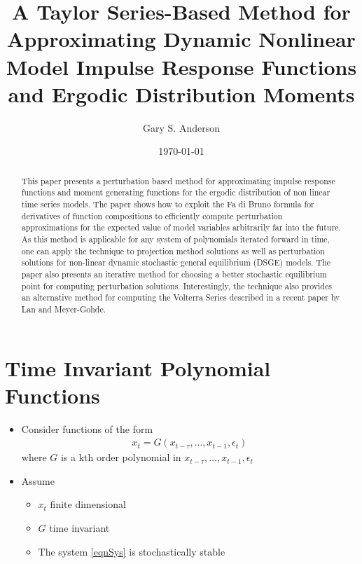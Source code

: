 \documentclass[12pt]{article}
\title{A Taylor Series-{Based} Method for Approximating Dynamic Nonlinear Model Impulse Response Functions and Ergodic Distribution Moments }
\author{Gary S. Anderson}
\date{\today}
\begin{document}
\maketitle
\begin{abstract}
  This paper presents a perturbation based method for approximating
impulse response functions and moment generating functions for the ergodic distribution of non linear time series models. The paper shows how to exploit the Fa di Bruno formula for derivatives of function compositions to efficiently compute perturbation approximations for the expected value of model variables arbitrarily far into the future. As this method is applicable for any system of polynomials iterated forward in time, one can apply the technique to projection method solutions as well as perturbation solutions for non-linear dynamic stochastic general equilibrium (DSGE) models. The paper also presents an iterative method for choosing a better stochastic equilibrium point for computing perturbation solutions. Interestingly, the technique also provides an alternative method for computing the Volterra Series described in a recent paper by Lan and Meyer-Gohde.
\end{abstract}


\newpage


\tableofcontents


\newpage

\section{Time Invariant Polynomial Functions} 

  \begin{itemize}
  \item Consider functions of the form
\begin{gather}
  x_t= G(x_{t-\tau},\ldots,x_{t-1},\epsilon_t) \label{eqnSys}
\end{gather}
 where $G$ is a kth order polynomial in $x_{t-\tau},\ldots,x_{t-1},\epsilon_t$
\item Assume 
  \begin{itemize}
  \item $x_t$ finite dimensional
  \item $G$ time invariant
  \item The system \ref{eqnSys} is stochastically stable\cite{tong90}
  \end{itemize}


  \end{itemize}
\end{document}
